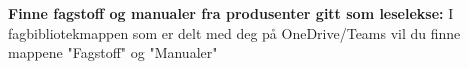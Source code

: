 \vskip 10pt

\noindent


\noindent
{\bf Finne fagstoff og manualer fra produsenter gitt som leselekse:} I fagbibliotekmappen som er delt med deg på OneDrive/Teams vil du finne mappene "Fagstoff" og  "Manualer" 



\vskip 10pt

\noindent

\vskip 10pt

\noindent

\vskip 10pt

